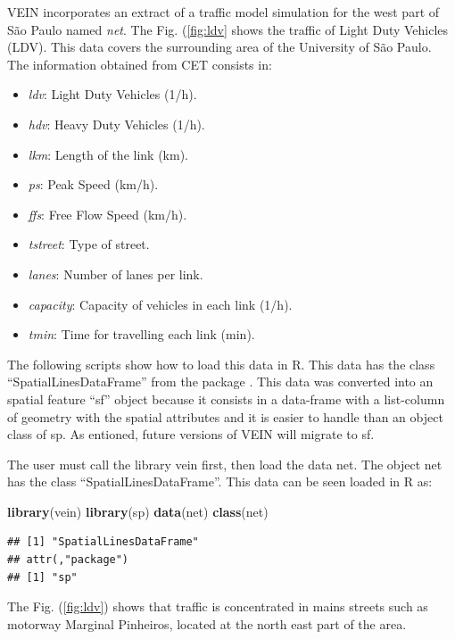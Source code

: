 \documentclass[12pt,graybox,envcountchap,sectrefs]{krantz}
\makeatletter
\newenvironment{Shaded}{\begin{snugshade}}{\end{snugshade}}
\newcommand{\KeywordTok}[1]{\textcolor[rgb]{0.13,0.29,0.53}{\textbf{#1}}}
\newcommand{\NormalTok}[1]{#1}
\providecommand{\tightlist}{%
  \setlength{\itemsep}{0pt}\setlength{\parskip}{0pt}}
\newenvironment{kframe}{%
\medskip{}
\setlength{\fboxsep}{.8em}
 \def\at@end@of@kframe{}%
 \ifinner\ifhmode%
  \def\at@end@of@kframe{\end{minipage}}%
  \begin{minipage}{\columnwidth}%
 \fi\fi%
 \def\FrameCommand##1{\hskip\@totalleftmargin \hskip-\fboxsep
 \colorbox{shadecolor}{##1}\hskip-\fboxsep
     \hskip-\linewidth \hskip-\@totalleftmargin \hskip\columnwidth}%
 \MakeFramed {\advance\hsize-\width
   \@totalleftmargin\z@ \linewidth\hsize
   \@setminipage}}%
 {\par\unskip\endMakeFramed%
 \at@end@of@kframe}
\renewenvironment{Shaded}{\begin{kframe}}{\end{kframe}}
\theoremstyle{definition}
\theoremstyle{definition}
\theoremstyle{definition}
\theoremstyle{remark}
\makeatother
\begin{document}
VEIN incorporates an extract of a traffic model simulation for the west
part of São Paulo named \emph{net}. The Fig. (\ref{fig:ldv} shows the
traffic of Light Duty Vehicles (LDV). This data covers the surrounding
area of the University of São Paulo. The information obtained from CET
consists in:

\begin{itemize}
\tightlist
\item
  \emph{ldv}: Light Duty Vehicles (1/h).
\item
  \emph{hdv}: Heavy Duty Vehicles (1/h).
\item
  \emph{lkm}: Length of the link (km).
\item
  \emph{ps}: Peak Speed (km/h).
\item
  \emph{ffs}: Free Flow Speed (km/h).
\item
  \emph{tstreet}: Type of street.
\item
  \emph{lanes}: Number of lanes per link.
\item
  \emph{capacity}: Capacity of vehicles in each link (1/h).
\item
  \emph{tmin}: Time for travelling each link (min).
\end{itemize}

The following scripts show how to load this data in R. This data has the
class ``SpatialLinesDataFrame'' from the package \citep{sp}. This data
was converted into an spatial feature ``sf'' object \citep{sf} because
it consists in a data-frame with a list-column of geometry with the
spatial attributes and it is easier to handle than an object class of
sp. As entioned, future versions of VEIN will migrate to sf.

The user must call the library vein first, then load the data net. The
object net has the class ``SpatialLinesDataFrame''. This data can be
seen loaded in R as:

\begin{Shaded}
\begin{Highlighting}[]
\KeywordTok{library}\NormalTok{(vein)}
\KeywordTok{library}\NormalTok{(sp)}
\KeywordTok{data}\NormalTok{(net)}
\KeywordTok{class}\NormalTok{(net)}
\end{Highlighting}
\end{Shaded}

\begin{verbatim}
## [1] "SpatialLinesDataFrame"
## attr(,"package")
## [1] "sp"
\end{verbatim}

The Fig. (\ref{fig:ldv}) shows that traffic is concentrated in mains
streets such as motorway Marginal Pinheiros, located at the north east
part of the area.
\end{document}
